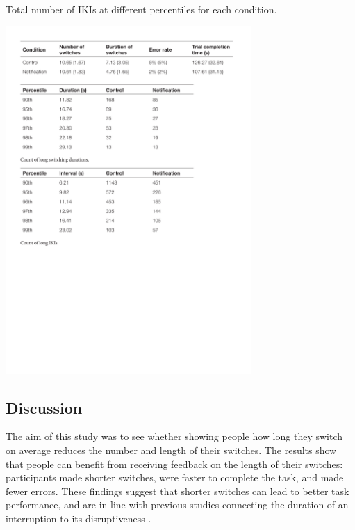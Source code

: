 \begin{table}
\caption{Total number of IKIs  at different percentiles for each condition.}
\centering
\includegraphics[width=0.7\textwidth]{images/ch56/ch56-longIKIs.pdf}
\vspace{-3pt}
\label{tbl:ch56-tblIKIs}
\end{table}

\subsection{Discussion}
The aim of this study was to see whether showing people how long they switch on average reduces the number and length of their switches. The results show that people can benefit from receiving feedback on the length of their switches: participants made shorter switches, were faster to complete the task, and made fewer errors. These findings suggest that shorter switches can lead to better task performance, and are in line with previous studies connecting the duration of an interruption to its disruptiveness \citep{Altmann2017, Monk2008}.

